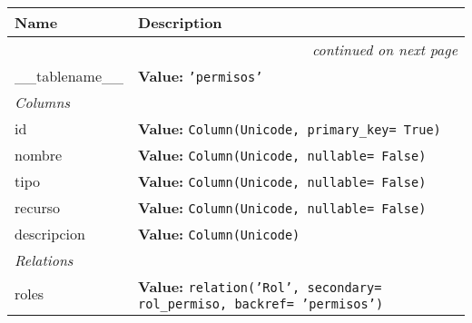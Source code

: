     \vspace{-1cm}
\hspace{\varindent}\begin{longtable}{|p{\varnamewidth}|p{\vardescrwidth}|l}
\cline{1-2}
\cline{1-2} \centering \textbf{Name} & \centering \textbf{Description}& \\
\cline{1-2}
\endhead\cline{1-2}\multicolumn{3}{r}{\small\textit{continued on next page}}\\\endfoot\cline{1-2}
\endlastfoot\raggedright \_\-\_\-t\-a\-b\-l\-e\-n\-a\-m\-e\-\_\-\_\- & \raggedright \textbf{Value:} 
{\tt 'permisos'}&\\
\cline{1-2}
\multicolumn{2}{|l|}{\textit{Columns}}\\
\cline{1-2}
\raggedright i\-d\- & \raggedright \textbf{Value:} 
{\tt Column(Unicode, primary\_key= True)}&\\
\cline{1-2}
\raggedright n\-o\-m\-b\-r\-e\- & \raggedright \textbf{Value:} 
{\tt Column(Unicode, nullable= False)}&\\
\cline{1-2}
\raggedright t\-i\-p\-o\- & \raggedright \textbf{Value:} 
{\tt Column(Unicode, nullable= False)}&\\
\cline{1-2}
\raggedright r\-e\-c\-u\-r\-s\-o\- & \raggedright \textbf{Value:} 
{\tt Column(Unicode, nullable= False)}&\\
\cline{1-2}
\raggedright d\-e\-s\-c\-r\-i\-p\-c\-i\-o\-n\- & \raggedright \textbf{Value:} 
{\tt Column(Unicode)}&\\
\cline{1-2}
\multicolumn{2}{|l|}{\textit{Relations}}\\
\cline{1-2}
\raggedright r\-o\-l\-e\-s\- & \raggedright \textbf{Value:} 
{\tt relation('Rol', secondary= rol\_permiso, backref= 'permisos')}&\\
\cline{1-2}
\end{longtable}


